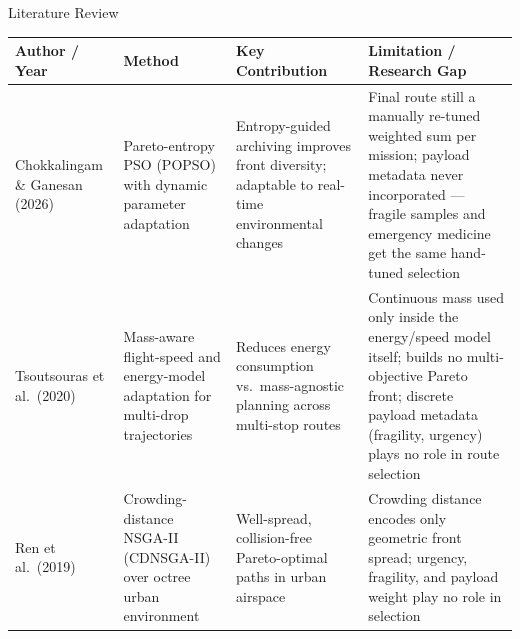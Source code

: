 \documentclass[aspectratio=169,11pt]{beamer}
\begin{document}
\begin{frame}{Literature Review}
  \scriptsize
  \begin{tabularx}{\textwidth}{%
      >{\raggedright\arraybackslash}p{2.6cm}
      >{\raggedright\arraybackslash}p{3.0cm}
      >{\raggedright\arraybackslash}p{2.8cm}
      >{\raggedright\arraybackslash}X}
    \toprule
    \textbf{Author / Year} & \textbf{Method} &
    \textbf{Key Contribution} & \textbf{Limitation / Research Gap}\\
    \midrule
    Chokkalingam \& Ganesan (2026)~\cite{r1} &
      Pareto-entropy PSO (POPSO) with dynamic parameter adaptation &
      Entropy-guided archiving improves front diversity; adaptable to
      real-time environmental changes &
      Final route still a manually re-tuned weighted sum per mission;
      payload metadata never incorporated --- fragile samples and
      emergency medicine get the same hand-tuned selection\\
    \addlinespace
    Tsoutsouras et al.\ (2020)~\cite{r10} &
      Mass-aware flight-speed and energy-model adaptation for
      multi-drop trajectories &
      Reduces energy consumption vs.\ mass-agnostic planning across
      multi-stop routes &
      Continuous mass used only inside the energy/speed model itself;
      builds no multi-objective Pareto front; discrete payload metadata
      (fragility, urgency) plays no role in route selection\\
    \addlinespace
    Ren et al.\ (2019)~\cite{r3} &
      Crowding-distance NSGA-II (CDNSGA-II) over octree urban
      environment &
      Well-spread, collision-free Pareto-optimal paths in urban
      airspace &
      Crowding distance encodes only geometric front spread; urgency,
      fragility, and payload weight play no role in selection\\
    \bottomrule
  \end{tabularx}
\end{frame}
\end{document}
